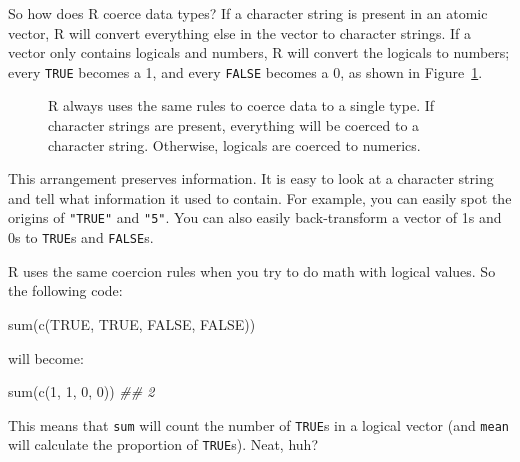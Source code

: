 \documentclass[
  letterpaper,
  DIV=11,
  numbers=noendperiod]{scrbook}
\makeatletter
\newenvironment{Shaded}{\begin{snugshade}}{\end{snugshade}}
\newcommand{\ConstantTok}[1]{\textcolor[rgb]{0.56,0.35,0.01}{#1}}
\newcommand{\DecValTok}[1]{\textcolor[rgb]{0.68,0.00,0.00}{#1}}
\newcommand{\DocumentationTok}[1]{\textcolor[rgb]{0.37,0.37,0.37}{\textit{#1}}}
\newcommand{\FunctionTok}[1]{\textcolor[rgb]{0.28,0.35,0.67}{#1}}
\newcommand{\NormalTok}[1]{\textcolor[rgb]{0.00,0.23,0.31}{#1}}
\newcommand*\pandocbounded[1]{%
  \sbox\pandoc@box{#1}%
  \Gscale@div\@tempa{\textheight}{\dimexpr\ht\pandoc@box+\dp\pandoc@box\relax}%
  \Gscale@div\@tempb{\linewidth}{\wd\pandoc@box}%
  \ifdim\@tempb\p@<\@tempa\p@\let\@tempa\@tempb\fi%
  \ifdim\@tempa\p@<\p@\scalebox{\@tempa}{\usebox\pandoc@box}%
  \else\usebox{\pandoc@box}%
  \fi%
}
\makeatother
\begin{document}
So how does R coerce data types? If a character string is present in an
atomic vector, R will convert everything else in the vector to character
strings. If a vector only contains logicals and numbers, R will convert
the logicals to numbers; every \texttt{TRUE} becomes a 1, and every
\texttt{FALSE} becomes a 0, as shown in Figure~\ref{fig-coercion}.

\begin{figure}

\centering{

\pandocbounded{\texttt{[image: images/hopr\_0301.png]}}

}

\caption{\label{fig-coercion}R always uses the same rules to coerce data
to a single type. If character strings are present, everything will be
coerced to a character string. Otherwise, logicals are coerced to
numerics.}

\end{figure}%

This arrangement preserves information. It is easy to look at a
character string and tell what information it used to contain. For
example, you can easily spot the origins of \texttt{"TRUE"} and
\texttt{"5"}. You can also easily back-transform a vector of 1s and 0s
to \texttt{TRUE}s and \texttt{FALSE}s.

R uses the same coercion rules when you try to do math with logical
values. So the following code:

\begin{Shaded}
\begin{Highlighting}[]
\FunctionTok{sum}\NormalTok{(}\FunctionTok{c}\NormalTok{(}\ConstantTok{TRUE}\NormalTok{, }\ConstantTok{TRUE}\NormalTok{, }\ConstantTok{FALSE}\NormalTok{, }\ConstantTok{FALSE}\NormalTok{))}
\end{Highlighting}
\end{Shaded}

will become:

\begin{Shaded}
\begin{Highlighting}[]
\FunctionTok{sum}\NormalTok{(}\FunctionTok{c}\NormalTok{(}\DecValTok{1}\NormalTok{, }\DecValTok{1}\NormalTok{, }\DecValTok{0}\NormalTok{, }\DecValTok{0}\NormalTok{))}
\DocumentationTok{\#\# 2}
\end{Highlighting}
\end{Shaded}

This means that \texttt{sum} will count the number of \texttt{TRUE}s in
a logical vector (and \texttt{mean} will calculate the proportion of
\texttt{TRUE}s). Neat, huh?
\end{document}
